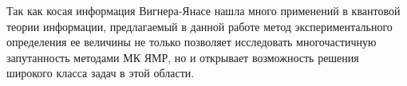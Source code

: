 Так как косая информация Вигнера-Янасе нашла много применений в квантовой теории информации, %
предлагаемый в данной работе метод экспериментального определения ее величины
не только позволяет исследовать многочастичную запутанность методами МК ЯМР,
но и открывает возможность решения широкого класса задач в этой области.
